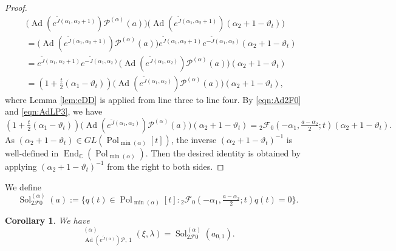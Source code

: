 \documentclass[a4paper,11pt,reqno]{amsart}
\newcommand{\CC}{\mathbb{C}}
\newcommand{\calF}{\mathcal{F}}
\newcommand{\calP}{\mathcal{P}}
\newcommand{\0}{{\bf 0}}
\newcommand{\1}{{\bf 1}}
\DeclareMathOperator{\Ad}{Ad}
\DeclareMathOperator{\End}{End}
\DeclareMathOperator{\Pol}{Pol}
\DeclareMathOperator{\Sol}{Sol}
\newcommand{\wJ}{\widetilde{J}}
\DeclareMathOperator{\wSol}{\widetilde{\Sol}}
\theoremstyle{plain}
\newtheorem{corollary}[equation]{Corollary}
\theoremstyle{definition}
\numberwithin{equation}{section}
\theoremstyle{definition}
\begin{document}
\begin{appendices}
\begin{proof}
\begin{align}
&\Big(\Ad(e^{\tilde{J}(\alpha_1,\alpha_2+1)})\calP^{(\alpha)}(a)\Big)
\Big(\Ad(e^{\tilde{J}(\alpha_1,\alpha_2+1)})(\alpha_2+1-\vartheta_t)\Big)
\nonumber\\[3pt]
&=
\Big(\Ad(e^{\tilde{J}(\alpha_1,\alpha_2+1)})\calP^{(\alpha)}(a)\Big)
e^{\tilde{J}(\alpha_1,\alpha_2+1)}e^{-\tilde{J}(\alpha_1,\alpha_2)}(\alpha_2+1-\vartheta_t)\nonumber\\[3pt]
&=e^{\tilde{J}(\alpha_1,\alpha_2+1)}e^{-\tilde{J}(\alpha_1,\alpha_2)}
\Big(\Ad(e^{\tilde{J}(\alpha_1,\alpha_2)})\calP^{(\alpha)}(a)\Big)(\alpha_2+1-\vartheta_t)
\nonumber \\[3pt]
&=(1+\tfrac{t}{2}(\alpha_1-\vartheta_t))\Big(\Ad(e^{\tilde{J}(\alpha_1,\alpha_2)})\calP^{(\alpha)}(a)\Big)(\alpha_2+1-\vartheta_t),\label{eqn:AdLP3}
\end{align}
where Lemma \ref{lem:eDD} is applied from line three to line four.
By \eqref{eqn:Ad2F0} and \eqref{eqn:AdLP3}, we have 
\begin{equation*}
(1+\tfrac{t}{2}(\alpha_1-\vartheta_t))\Big(\Ad(e^{\tilde{J}(\alpha_1,\alpha_2)})\calP^{(\alpha)}(a)\Big)(\alpha_2+1-\vartheta_t)
={}_2\calF_0(-\alpha_1,\tfrac{a-\alpha_2}{2};t)(\alpha_2+1-\vartheta_t).
\end{equation*}
As $(\alpha_2+1-\vartheta_t) \in GL(\Pol_{\min(\alpha)}[t])$, 
the inverse $(\alpha_2+1-\vartheta_t)^{-1}$ is well-defined in 
$\End_{\CC}(\Pol_{\min(\alpha)})$.
Then the desired identity is obtained by 
applying $(\alpha_2+1-\vartheta_t)^{-1}$  from the right to both sides.
\end{proof}

We define
\begin{equation*}
\Sol^{(\alpha)}_{2\calF0}(a)
:=\{q(t) \in \Pol_{\min{(\alpha)}}[t]: 
{}_2\calF_0(-\alpha_1,\tfrac{a-\alpha_2}{2};t)q(t)=0\}.
\end{equation*}

\begin{corollary}\label{cor:Sol2F02}
We have 
\begin{equation*}
\wSol_{\Ad(e^{\wJ(\alpha)}) \calP,\, 1}^{(\alpha)}(\xi,\lambda) 
= \Sol^{(\alpha)}_{2\calF0}(a_{0,1}).
\end{equation*}
\end{corollary}


\end{appendices}
\end{document}
